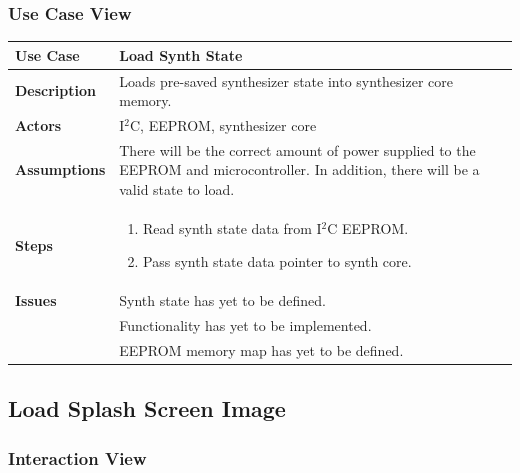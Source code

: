 \documentclass{article}
\begin{document}
\subsubsection{Use Case View}
\begin{tabular}{|p{1in}|p{5in}|}
\hline
\textbf{Use Case} & Load Synth State\\
\hline
\textbf{Description} & Loads pre-saved synthesizer state into synthesizer core memory.\\
\hline
\textbf{Actors} & I$^{2}$C, EEPROM, synthesizer core\\
\hline
\textbf{Assumptions} & There will be the correct amount of power supplied to the EEPROM and microcontroller.  In addition, there will be a valid state to load.\\
\hline
\textbf{Steps} & \begin{enumerate}
\item Read synth state data from I$^2$C EEPROM.
\item Pass synth state data pointer to synth core.
\end{enumerate}\\
\hline
\textbf{Issues} & Synth state has yet to be defined.\\
& Functionality has yet to be implemented.\\
& EEPROM memory map has yet to be defined.\\
\hline
\end{tabular}

\newpage

\subsection{Load Splash Screen Image}
\subsubsection{Interaction View}
\end{document}
